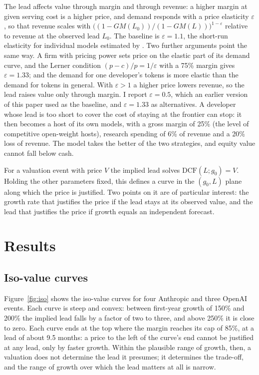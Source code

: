 \documentclass[12pt]{article}
\begin{document}
The lead affects value through margin and through revenue: a higher margin at given serving cost is a higher price, and demand responds with a price elasticity $\varepsilon$, so that revenue scales with $\bigl((1-GM(L_0))/(1-GM(L))\bigr)^{1-\varepsilon}$ relative to revenue at the observed lead $L_0$. The baseline is $\varepsilon = 1.1$, the short-run elasticity for individual models estimated by \citet{demirer2025market}. Two further arguments point the same way. A firm with pricing power sets price on the elastic part of its demand curve, and the Lerner condition $(p - c)/p = 1/\varepsilon$ with a 75\% margin gives $\varepsilon = 1.33$; and the demand for one developer's tokens is more elastic than the demand for tokens in general. With $\varepsilon > 1$ a higher price lowers revenue, so the lead raises value only through margin. I report $\varepsilon = 0.5$, which an earlier version of this paper used as the baseline, and $\varepsilon = 1.33$ as alternatives. A developer whose lead is too short to cover the cost of staying at the frontier can stop: it then becomes a host of its own models, with a gross margin of 25\% (the level of competitive open-weight hosts), research spending of 6\% of revenue and a 20\% loss of revenue. The model takes the better of the two strategies, and equity value cannot fall below cash.

For a valuation event with price $V$ the implied lead solves $\mathrm{DCF}(L; g_0) = V$. Holding the other parameters fixed, this defines a curve in the $(g_0, L)$ plane along which the price is justified. Two points on it are of particular interest: the growth rate that justifies the price if the lead stays at its observed value, and the lead that justifies the price if growth equals an independent forecast.

\section{Results}\label{sec:results}

\subsection{Iso-value curves}

Figure~\ref{fig:iso} shows the iso-value curves for four Anthropic and three OpenAI events. Each curve is steep and convex: between first-year growth of 150\% and 200\% the implied lead falls by a factor of two to three, and above 250\% it is close to zero. Each curve ends at the top where the margin reaches its cap of 85\%, at a lead of about 9.5 months: a price to the left of the curve's end cannot be justified at any lead, only by faster growth. Within the plausible range of growth, then, a valuation does not determine the lead it presumes; it determines the trade-off, and the range of growth over which the lead matters at all is narrow.
\end{document}
